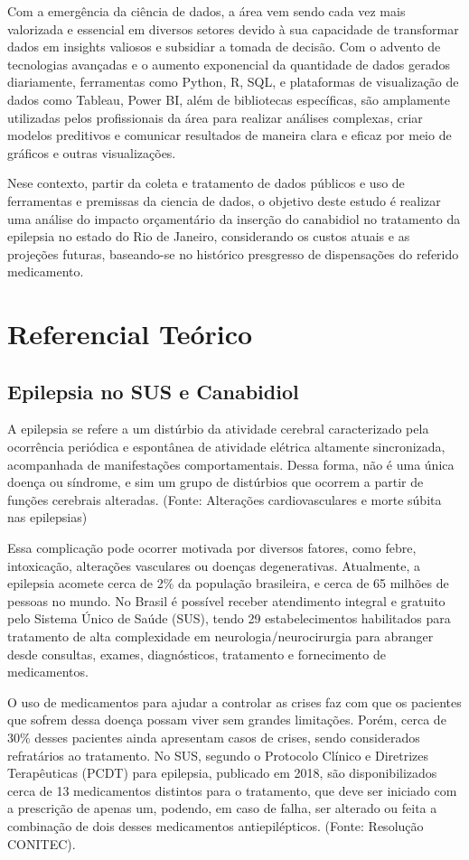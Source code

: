 \documentclass[article,a4paper,12pt,brazil,sumario=tradicional]{abntex2}
\begin{document}
Com a emergência da ciência de dados, a área vem sendo cada vez mais valorizada e essencial em diversos setores devido à sua capacidade de transformar dados em insights valiosos e subsidiar a tomada de decisão. Com o advento de tecnologias avançadas e o aumento exponencial da quantidade de dados gerados diariamente, ferramentas como Python, R, SQL, e plataformas de visualização de dados como Tableau, Power BI, além de bibliotecas específicas, são amplamente utilizadas pelos profissionais da área para realizar análises complexas, criar modelos preditivos e comunicar resultados de maneira clara e eficaz por meio de gráficos e outras visualizações.

Nese contexto, partir da coleta e tratamento de dados públicos e uso de ferramentas e premissas da ciencia de dados, o objetivo deste estudo é realizar uma análise do impacto orçamentário da inserção do canabidiol no tratamento da epilepsia no estado do Rio de Janeiro, considerando os custos atuais e as projeções futuras, baseando-se no histórico presgresso de dispensações do referido medicamento.

\section{Referencial Teórico}

\subsection{Epilepsia no SUS e Canabidiol}
A epilepsia se refere a um distúrbio da atividade cerebral caracterizado pela ocorrência periódica e espontânea de atividade elétrica altamente sincronizada, acompanhada de manifestações comportamentais. Dessa forma, não é uma única doença ou síndrome, e sim um grupo de distúrbios que ocorrem a partir de funções cerebrais alteradas. (Fonte: Alterações cardiovasculares e morte súbita nas epilepsias)

Essa complicação pode ocorrer motivada por diversos fatores, como febre, intoxicação, alterações vasculares ou doenças degenerativas. Atualmente, a epilepsia acomete cerca de 2\% da população brasileira, e cerca de 65 milhões de pessoas no mundo. No Brasil é possível receber atendimento integral e gratuito pelo Sistema Único de Saúde (SUS), tendo 29 estabelecimentos habilitados para tratamento de alta complexidade em neurologia/neurocirurgia para abranger desde consultas, exames, diagnósticos, tratamento e fornecimento de medicamentos.

O uso de medicamentos para ajudar a controlar as crises faz com que os pacientes que sofrem dessa doença possam viver sem grandes limitações. Porém, cerca de 30\% desses pacientes ainda apresentam casos de crises, sendo considerados refratários ao tratamento. No SUS, segundo o Protocolo Clínico e Diretrizes Terapêuticas (PCDT) para epilepsia, publicado em 2018, são disponibilizados cerca de 13 medicamentos distintos para o tratamento, que deve ser iniciado com a prescrição de apenas um, podendo, em caso de falha, ser alterado ou feita a combinação de dois desses medicamentos antiepilépticos. (Fonte: Resolução CONITEC).
\end{document}
